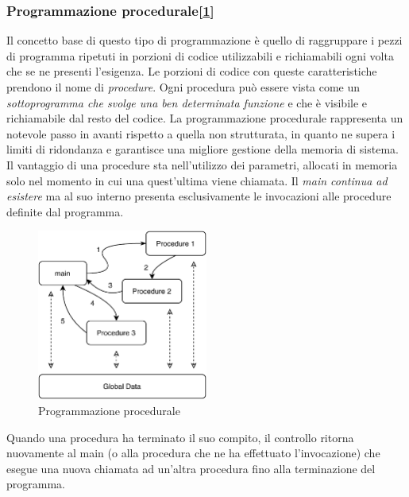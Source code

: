 \subsubsection{Programmazione procedurale[\ref{fig:procedural-programming}]}
Il concetto base di questo tipo di programmazione è quello di raggruppare i pezzi di programma ripetuti in porzioni di codice utilizzabili e richiamabili ogni volta che se ne presenti l’esigenza. Le porzioni di codice con queste caratteristiche prendono il nome di \textit{procedure}. Ogni procedura può essere vista come un \textit{sottoprogramma che svolge una ben determinata funzione} e che è visibile e richiamabile dal resto del codice. La programmazione procedurale rappresenta un notevole passo in avanti rispetto a quella non strutturata, in quanto ne supera i limiti di ridondanza e garantisce una migliore gestione della memoria di sistema. Il vantaggio di una procedure sta nell'utilizzo dei parametri, allocati in memoria solo nel momento in cui una quest'ultima viene chiamata. Il \textit{main continua ad esistere} ma al suo interno presenta esclusivamente le invocazioni alle procedure definite dal programma. 
\begin{figure}[H]
    \centering
    \includegraphics[width=0.50\textwidth]{images/01_2_procedural_programming.pdf}
    \caption{Programmazione procedurale}
    \label{fig:procedural-programming}
\end{figure}
Quando una procedura ha terminato il suo compito, il controllo ritorna nuovamente al main (o alla procedura che ne ha effettuato l’invocazione) che esegue una nuova chiamata ad un’altra procedura fino alla terminazione del programma.

